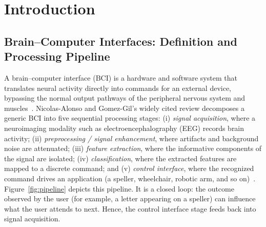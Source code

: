 \documentclass[11pt]{article}
\begin{document}
\section{Introduction}

\subsection{Brain--Computer Interfaces: Definition and Processing Pipeline}

A brain--computer interface (BCI) is a hardware and software system that translates neural activity directly into commands for an external device, bypassing the normal output pathways of the peripheral nervous system and muscles~\cite{nicolasalonso2012bci}. Nicolas-Alonso and Gomez-Gil's widely cited review decomposes a generic BCI into five sequential processing stages: (i) \textit{signal acquisition}, where a neuroimaging modality such as electroencephalography (EEG) records brain activity; (ii) \textit{preprocessing / signal enhancement}, where artifacts and background noise are attenuated; (iii) \textit{feature extraction}, where the informative components of the signal are isolated; (iv) \textit{classification}, where the extracted features are mapped to a discrete command; and (v) \textit{control interface}, where the recognized command drives an application (a speller, wheelchair, robotic arm, and so on)~\cite{nicolasalonso2012bci}. Figure~\ref{fig:pipeline} depicts this pipeline. It is a closed loop: the outcome observed by the user (for example, a letter appearing on a speller) can influence what the user attends to next. Hence, the control interface stage feeds back into signal acquisition.
\end{document}
